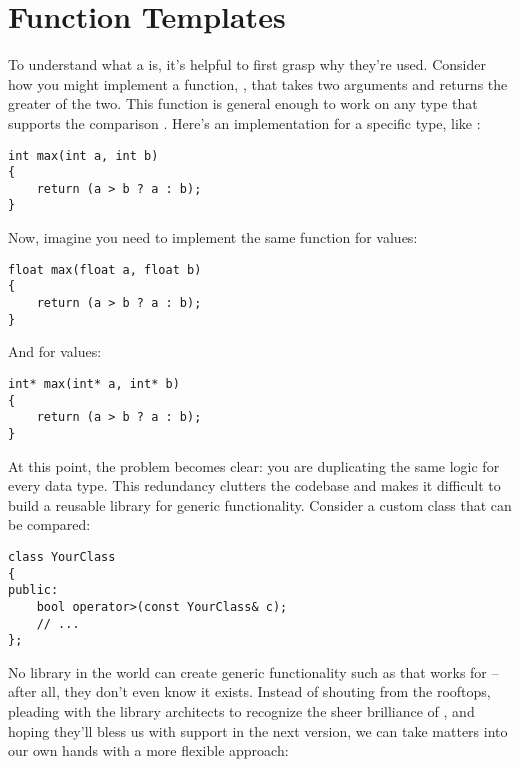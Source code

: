 \documentclass[12pt]{article}
\begin{document}
\section{Function Templates}

\noindent
To understand what a  is, it's helpful to first grasp why they're used.
Consider how you might implement a function, , that takes two arguments and returns the greater of the two.
This function is general enough to work on any type that supports the comparison .
Here's an implementation for a specific type, like :

\begin{lstlisting}[style=cxx]
int max(int a, int b)
{
    return (a > b ? a : b);
}
\end{lstlisting}

\noindent
Now, imagine you need to implement the same  function for  values:

\begin{lstlisting}[style=cxx]
float max(float a, float b)
{
    return (a > b ? a : b);
}
\end{lstlisting}

\noindent
And for  values:

\begin{lstlisting}[style=cxx]
int* max(int* a, int* b)
{
    return (a > b ? a : b);
}
\end{lstlisting}

\noindent
At this point, the problem becomes clear: you are duplicating the same logic for every data type.
This redundancy clutters the codebase and makes it difficult to build a reusable library for generic functionality.
Consider a custom class that can be compared:

\begin{lstlisting}[style=cxx]
class YourClass
{
public:
    bool operator>(const YourClass& c);
    // ...
};
\end{lstlisting}

\noindent
No library in the world can create generic functionality such as  that works for --after all, they don't even know it exists.
Instead of shouting from the rooftops, pleading with the library architects to recognize the sheer brilliance of , and hoping they'll bless us with support in the next version, we can take matters into our own hands with a more flexible approach:
\end{document}
